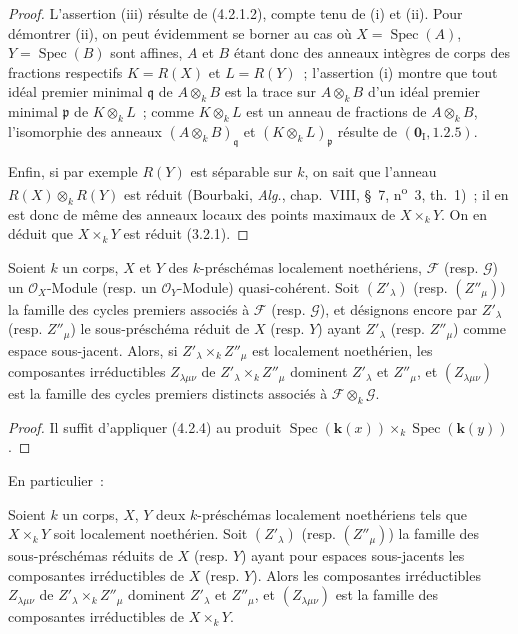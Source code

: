 \begin{proof}
L'assertion (iii) résulte de (4.2.1.2), compte tenu de (i) et (ii). Pour
démontrer (ii), on peut évidemment se borner au cas où
$X=\operatorname{Spec}(A)$, $Y=\operatorname{Spec}(B)$ sont affines, $A$ et
$B$ étant donc des anneaux intègres de corps des fractions respectifs
$K=R(X)$ et $L=R(Y)$~; l'assertion (i) montre que tout idéal premier minimal
$\mathfrak q$ de $A\otimes_k B$ est la trace sur $A\otimes_k B$ d'un idéal
premier minimal $\mathfrak p$ de $K\otimes_k L$~; comme $K\otimes_k L$ est un
anneau de fractions de $A\otimes_k B$, l'isomorphie des anneaux
$(A\otimes_k B)_{\mathfrak q}$ et $(K\otimes_k L)_{\mathfrak p}$ résulte de
$(\mathbf{0}_{\mathrm I},1.2.5)$.

Enfin, si par exemple $R(Y)$ est séparable sur $k$,
on sait que l'anneau $R(X)\otimes_k R(Y)$ est réduit (Bourbaki,
\emph{Alg.}, chap.~VIII, \S~7, n\textsuperscript{o}~3, th.~1)~; il en est donc
de même des anneaux locaux des points maximaux de $X\times_k Y$. On en déduit
que $X\times_k Y$ est réduit (3.2.1).
\end{proof}

\begin{proposition}[4.2.5]
\label{IV.2.4.2.5-fr}
Soient $k$ un corps, $X$ et $Y$ des $k$-préschémas localement noethériens,
$\mathcal F$ \textup{(resp. $\mathcal G$)} un $\mathcal O_X$-Module \textup{(resp.} un
$\mathcal O_Y$-Module\textup{)} quasi-cohérent. Soit $(Z'_\lambda)$ \textup{(resp.
$(Z''_\mu)$)} la famille des cycles premiers associés à $\mathcal F$ \textup{(resp.
$\mathcal G$)}, et désignons encore par $Z'_\lambda$ \textup{(resp. $Z''_\mu$)} le
sous-préschéma réduit de $X$ \textup{(resp. $Y$)} ayant $Z'_\lambda$ \textup{(resp.
$Z''_\mu$)} comme espace sous-jacent. Alors, si $Z'_\lambda\times_k Z''_\mu$
est localement noethérien, les composantes irréductibles $Z_{\lambda\mu\nu}$
de $Z'_\lambda\times_k Z''_\mu$ dominent $Z'_\lambda$ et $Z''_\mu$, et
$(Z_{\lambda\mu\nu})$ est la famille des cycles premiers distincts associés à
$\mathcal F\otimes_k\mathcal G$.
\end{proposition}

\begin{proof}
Il suffit d'appliquer (4.2.4) au produit
$\operatorname{Spec}(\boldsymbol{k}(x))\times_k\operatorname{Spec}(\boldsymbol{k}(y))$.
\end{proof}

En particulier~:

\begin{corollary}[4.2.6]
\label{IV.2.4.2.6-fr}
Soient $k$ un corps, $X$, $Y$ deux $k$-préschémas localement noethériens tels
que $X\times_k Y$ soit localement noethérien. Soit $(Z'_\lambda)$ \textup{(resp.
$(Z''_\mu)$)} la famille des sous-préschémas réduits de $X$ \textup{(resp. $Y$)} ayant
pour espaces sous-jacents les composantes irréductibles de $X$ \textup{(resp. $Y$)}.
Alors les composantes irréductibles $Z_{\lambda\mu\nu}$ de
$Z'_\lambda\times_k Z''_\mu$ dominent $Z'_\lambda$ et $Z''_\mu$, et
$(Z_{\lambda\mu\nu})$ est la famille des composantes irréductibles de
$X\times_k Y$.
\end{corollary}

